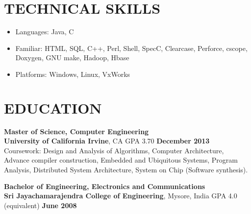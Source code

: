\documentclass{system}
\begin{document}
\thispagestyle{empty} %

\address{{\Large PAVAN PATTANADA }\vspace{12pt} \\ 3700 Parkview Lane Apartment 6D Irvine,CA 92612}      
                                      
\address{\hfill {http://www.linkedin.com/in/pavanpattanada}\\
  \hfill pattanad@uci.edu \\ \hfill (949) 743-4307 }



\begin{resume}
\section {TECHNICAL SKILLS}
\hrulefill
   \begin{itemize} \itemsep -2pt %
   \item Languages: Java, C
   \item Familiar: HTML, SQL, C++, Perl, Shell, SpecC, Clearcase, Perforce, cscope,
 Doxygen, GNU make, Hadoop, Hbase
   \item Platforms: Windows, Linux, VxWorks
 \end{itemize}
\vspace{0.2in} 
 
\section{EDUCATION} 
\hrulefill 
 
{\bfseries Master of Science, Computer Engineering} \\
{\bfseries University of California Irvine}, CA \hspace{0.2in}  GPA 3.70
\hfill {\bfseries December 2013} \\
Coursework: Design and Analysis of Algorithms, Computer Architecture, Advance
compiler construction, Embedded and Ubiquitous Systems, Program Analysis,
Distributed System Architecture, System on Chip (Software synthesis). 

\vspace{0.2in} 
 
{\bfseries Bachelor of Engineering, Electronics and Communications} \\ %
{\bfseries Sri Jayachamarajendra College of Engineering}, Mysore, India
\hspace{0.2in}  GPA 4.0 (equivalent)
\hfill    {\bfseries June 2008}
  

\end{resume}
\end{document}
